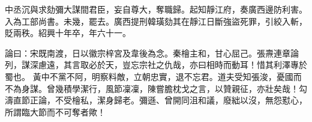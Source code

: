 \begin{pinyinscope}
 中丞沉與求劾彌大謀間君臣，妄自尊大，奪職歸。起知靜江府，奏廣西邊防利害。入為工部尚書。未幾，罷去。廣西提刑韓璜劾其在靜江日斷強盜死罪，引絞入斬，貶兩秩。紹興十年卒，年六十一。



 論曰：宋既南渡，日以徽宗梓宮及韋後為念。秦檜主和，甘心屈己。張燾連章論列，謀深慮遠，其言取必於天，豈忘宗社之仇哉，亦曰相時而動耳！惜其利澤專於蜀也。
 黃中不黨不阿，明察料敵，立朝忠實，退不忘君。道夫受知張浚，憂國而不為身謀。曾幾積學潔行，風節凜凜，陳嘗膽枕戈之言，以贊親征，亦壯矣哉！勾濤直節正論，不受檜私，潔身歸老。彌遜、曾開同沮和議，廢絀以沒，無怨懟心，所謂臨大節而不可奪者歟！



\end{pinyinscope}